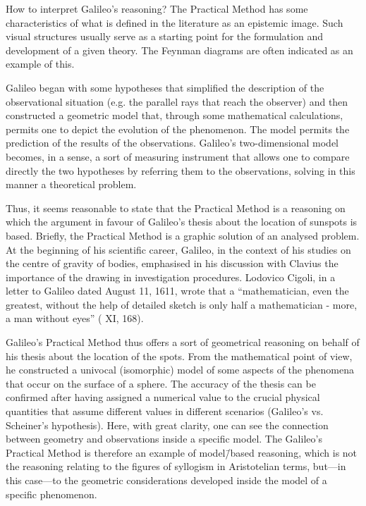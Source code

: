 \begin{artengenv}
How to interpret Galileo’s reasoning? The Practical Method has some characteristics of what is defined in the literature
as an epistemic image. Such visual structures usually serve as a starting point for the formulation and development of
a given theory. The Feynman diagrams are often indicated as an example of this.

Galileo began with some hypotheses that simplified the description of the observational situation (e.g. the parallel
rays that reach the observer) and then constructed a geometric model that, through some mathematical calculations,
permits one to depict the evolution of the phenomenon. The model permits the prediction of the results of the
observations. Galileo’s two-dimensional model becomes, in a sense, a sort of measuring instrument that allows one to
compare directly the two hypotheses by referring them to the observations, solving in this manner a theoretical
problem. 

Thus, it seems reasonable to state that the Practical Method is a reasoning on which the argument in favour of
Galileo’s thesis about the location of sunspots is based. Briefly, the Practical Method is a graphic solution of an analysed
problem. At the beginning of his scientific career, Galileo, in the context of his studies on the centre of gravity of
bodies, emphasised in his discussion with Clavius the importance of the drawing in investigation procedures. Lodovico
Cigoli, in a letter to Galileo dated August 11, 1611, wrote that a ``mathematician, even the greatest, without the help
of detailed sketch is only half a mathematician - more, a man without eyes'' ( XI, 168).

Galileo’s Practical Method thus offers a sort of geometrical reasoning on behalf of his thesis about the location of the
spots. From the mathematical point of view, he constructed a univocal (isomorphic) model of some aspects of the
phenomena that occur on the surface of a sphere. The accuracy of the thesis can be confirmed after having assigned a
numerical value to the crucial physical quantities that assume different values in different scenarios (Galileo’s
vs. Scheiner’s hypothesis). Here, with great clarity, one can see the connection between geometry and
observations inside a specific model. The Galileo’s Practical Method is therefore an example of model\=/based reasoning,
which is not the reasoning relating to the figures of syllogism in Aristotelian terms, but---in this case---to the
geometric considerations developed inside the model of a specific phenomenon. 


\end{artengenv}
